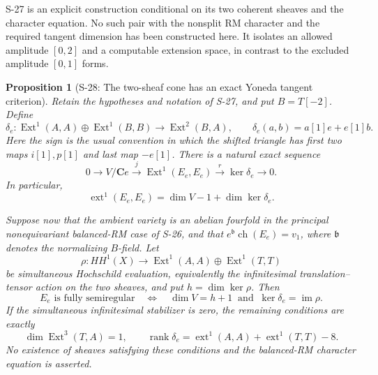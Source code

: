 \documentclass[11pt,a4paper]{article}
\newtheorem{proposition}[theorem]{Proposition}
\theoremstyle{definition}
\begin{document}
S-27 is an explicit construction conditional on its two
coherent sheaves and the character equation. No such pair
with the nonsplit RM character and the required tangent
dimension has been constructed here. It isolates an
allowed amplitude $[0,2]$ and a computable extension space,
in contrast to the excluded amplitude $[0,1]$ forms.

\begin{proposition}[S-28: The two-sheaf cone has an exact Yoneda tangent criterion]
\label{prop:semireg-cone-exact-tangent}
Retain the hypotheses and notation of S-27, and put
$B=T[-2]$. Define
\[
 \delta_e:\operatorname{Ext}^1(A,A)\oplus
                 \operatorname{Ext}^1(B,B)
        \longrightarrow\operatorname{Ext}^2(B,A),
 \qquad
 \delta_e(a,b)=a[1]e+e[1]b.
 \tag{S28.1}
\]
Here the sign is the usual convention in which the shifted
triangle has first two maps $i[1],p[1]$ and last map
$-e[1]$. There is a natural exact sequence
\[
 0\longrightarrow V/\mathbf C e
   \xrightarrow{j}\operatorname{Ext}^1(E_e,E_e)
   \xrightarrow{r}\ker\delta_e\longrightarrow0.
 \tag{S28.2}
\]
In particular,
\[
 \operatorname{ext}^1(E_e,E_e)
   =\dim V-1+\dim\ker\delta_e.
 \tag{S28.3}
\]

Suppose now that the ambient variety is an abelian fourfold
in the principal nonequivariant balanced-RM case of S-26,
and that $e^{\mathfrak b}\operatorname{ch}(E_e)=v_1$,
where $\mathfrak b$ denotes the normalizing $B$-field.
Let
\[
 \rho:HH^1(X)\longrightarrow
       \operatorname{Ext}^1(A,A)\oplus
       \operatorname{Ext}^1(T,T)
 \tag{S28.4}
\]
be simultaneous Hochschild evaluation, equivalently the
infinitesimal translation--tensor action on the two sheaves,
and put $h=\dim\ker\rho$. Then
\[
 E_e\text{ is fully semiregular}
 \quad\Longleftrightarrow\quad
 \dim V=h+1\ \text{ and }\ \ker\delta_e=\operatorname{im}\rho.
 \tag{S28.5}
\]
If the simultaneous infinitesimal stabilizer is zero,
the remaining conditions are exactly
\[
 \dim\operatorname{Ext}^3(T,A)=1,
 \qquad
 \operatorname{rank}\delta_e=
       \operatorname{ext}^1(A,A)+\operatorname{ext}^1(T,T)-8.
 \tag{S28.6}
\]
No existence of sheaves satisfying these conditions and
the balanced-RM character equation is asserted.
\end{proposition}
\end{document}
